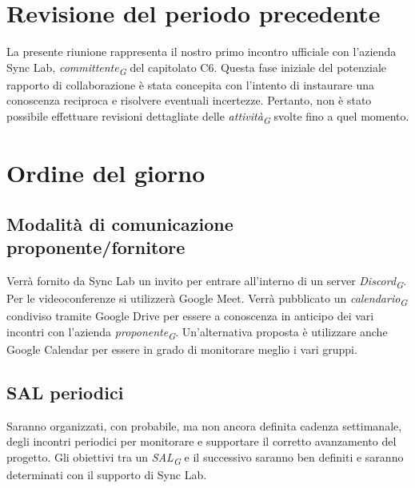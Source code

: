 \documentclass{article}
\begin{document}
\maketitle
\thispagestyle{fancy}
\tableofcontents 
{} 
\pagebreak

\flushleft

\section{Revisione del periodo precedente} 
    La presente riunione rappresenta il nostro primo incontro ufficiale con l'azienda Sync Lab, \textit{committente}\textsubscript{\textit{G}} del capitolato C6. Questa fase iniziale del potenziale rapporto di collaborazione è stata concepita con l'intento di instaurare una conoscenza reciproca e risolvere eventuali incertezze. Pertanto, non è stato possibile effettuare revisioni dettagliate delle \textit{attività}\textsubscript{\textit{G}} svolte fino a quel momento.  

\section{Ordine del giorno} 
    \subsection{Modalità di comunicazione proponente/fornitore}
        Verrà fornito da Sync Lab un invito per entrare all’interno di un server \textit{Discord}\textsubscript{\textit{G}}.
        Per le videoconferenze si utilizzerà Google Meet. 
        Verrà pubblicato un \textit{calendario}\textsubscript{\textit{G}} condiviso tramite Google Drive per essere a conoscenza in anticipo dei vari incontri con l’azienda \textit{proponente}\textsubscript{\textit{G}}. Un’alternativa proposta è utilizzare anche Google Calendar per essere in grado di monitorare meglio i vari gruppi. 

    \subsection{SAL periodici}
        Saranno organizzati, con probabile, ma non ancora definita cadenza settimanale, degli incontri periodici per monitorare e supportare il corretto avanzamento del progetto.
        Gli obiettivi tra un \textit{SAL}\textsubscript{\textit{G}} e il successivo saranno ben definiti e saranno determinati con il supporto di Sync Lab. 
\end{document}
